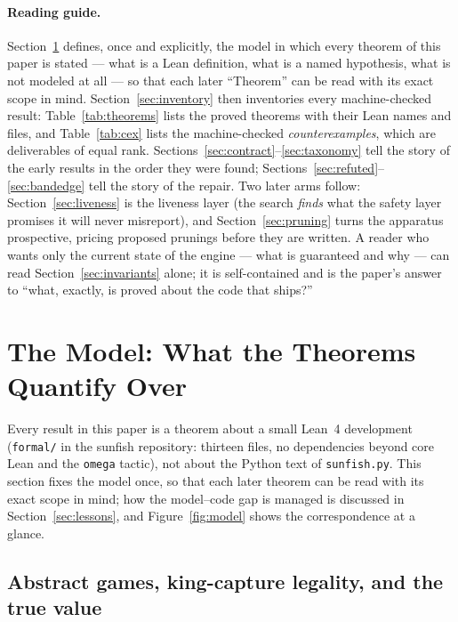 \documentclass[11pt]{article}
\theoremstyle{plain}
\theoremstyle{definition}
\theoremstyle{remark}
\begin{document}
\paragraph{Reading guide.}
Section~\ref{sec:model} defines, once and explicitly, the model in which
every theorem of this paper is stated --- what is a Lean definition,
what is a named hypothesis, what is not modeled at all --- so that each
later ``Theorem'' can be read with its exact scope in mind.
Section~\ref{sec:inventory} then inventories every machine-checked
result: Table~\ref{tab:theorems} lists the proved theorems with their
Lean names and files, and Table~\ref{tab:cex} lists the machine-checked
\emph{counterexamples}, which are deliverables of equal rank.
Sections~\ref{sec:contract}--\ref{sec:taxonomy} tell the story of the
early results in the order they were found;
Sections~\ref{sec:refuted}--\ref{sec:bandedge} tell the story of the
repair.  Two later arms follow: Section~\ref{sec:liveness} is the
liveness layer (the search \emph{finds} what the safety layer promises
it will never misreport), and Section~\ref{sec:pruning} turns the
apparatus prospective, pricing proposed prunings before they are
written.  A reader who wants only the current state of the engine ---
what is guaranteed and why --- can read Section~\ref{sec:invariants}
alone; it is self-contained and is the paper's answer to ``what,
exactly, is proved about the code that ships?''

\section{The Model: What the Theorems Quantify Over}
\label{sec:model}

Every result in this paper is a theorem about a small Lean~4 development
(\texttt{formal/} in the sunfish repository: thirteen files, no dependencies
beyond core Lean and the \texttt{omega} tactic), not about the Python
text of \texttt{sunfish.py}.  This section fixes the model once, so that
each later theorem can be read with its exact scope in mind; how the
model--code gap is managed is discussed in Section~\ref{sec:lessons},
and Figure~\ref{fig:model} shows the correspondence at a glance.

\subsection{Abstract games, king-capture legality, and the true value}
\label{sec:model-games}
\end{document}
